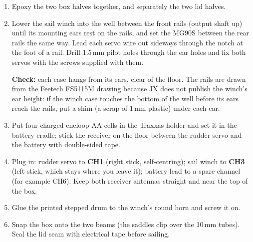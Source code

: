 \documentclass[11pt]{article}
\newcommand{\chk}[1]{\par\noindent\textbf{Check:} #1\par}
\begin{document}
\begin{enumerate}
\item Epoxy the two box halves together, and separately the two lid halves.
\item Lower the sail winch into the well between the front rails (output shaft up) until its mounting ears rest on the rails, and set the MG90S between the rear rails the same way. Lead each servo wire out sideways through the notch at the foot of a rail. Drill 1.5\,mm pilot holes through the ear holes and fix both servos with the screws supplied with them.
\chk{each case hangs from its ears, clear of the floor. The rails are drawn from the Feetech FS5115M drawing because JX does not publish the winch's ear height: if the winch case touches the bottom of the well before its ears reach the rails, put a shim (a scrap of 1\,mm plastic) under each ear.}
\item Put four charged eneloop AA cells in the Traxxas holder and set it in the battery cradle; stick the receiver on the floor between the rudder servo and the battery with double-sided tape.
\item Plug in: rudder servo to \textbf{CH1} (right stick, self-centring); sail winch to \textbf{CH3} (left stick, which stays where you leave it); battery lead to a spare channel (for example CH6). Keep both receiver antennas straight and near the top of the box.
\item Glue the printed stepped drum to the winch's round horn and screw it on.
\item Snap the box onto the two beams (the saddles clip over the 10\,mm tubes). Seal the lid seam with electrical tape before sailing.
\end{enumerate}
\end{document}
